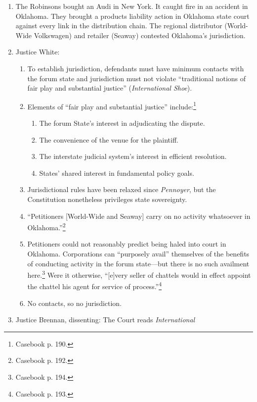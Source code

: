 \begin{enumerate}
    \item The Robinsons bought an Audi in New York. It caught fire in an
    accident in Oklahoma. They brought a products liability action in Oklahoma 
    state court against every link in the distribution chain. The regional 
    distributor (World-Wide Volkswagen) and retailer (Seaway) contested Oklahoma's 
    jurisdiction.
    \item Justice White: \begin{enumerate}
        \item To establish jurisdiction, defendants must have minimum contacts 
        with the forum state and jurisdiction must not violate ``traditional 
        notions of fair play and substantial justice'' (\emph{International 
        Shoe}).
        \item Elements of ``fair play and substantial justice'' 
        include:\footnote{Casebook p. 190.}
        \begin{enumerate}
            \item The forum State's interest in adjudicating the dispute.
            \item The convenience of the venue for the plaintiff.
            \item The interstate judicial system's interest in efficient 
            resolution.
            \item States' shared interest in fundamental policy goals.
        \end{enumerate}
        \item Jurisdictional rules have been relaxed since \emph{Pennoyer}, 
        but the Constitution nonetheless privileges state sovereignty.  \item 
        ``Petitioners [World-Wide and Seaway] carry on no activity whatsoever 
        in Oklahoma.''\footnote{Casebook p. 192.}
        \item Petitioners could not reasonably predict being haled into court 
        in Oklahoma. Corporations can ``purposely avail'' themselves of the 
        benefits of conducting activity in the forum state---but there is no 
        such availment here.\footnote{Casebook p. 194.} Were it otherwise, 
        ``[e]very seller of chattels would in effect appoint the chattel his 
        agent for service of process.''\footnote{Casebook p. 193.}
        \item No contacts, so no jurisdiction.
    \end{enumerate}
    \item Justice Brennan, dissenting: The Court reads \emph{International 
}
\end{enumerate}
